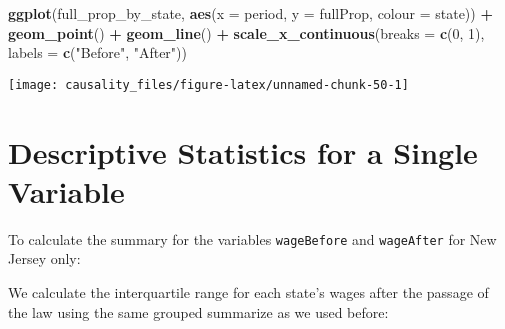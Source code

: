 \documentclass[]{book}
\newenvironment{Shaded}{\begin{snugshade}}{\end{snugshade}}
\newcommand{\KeywordTok}[1]{\textcolor[rgb]{0.13,0.29,0.53}{\textbf{#1}}}
\newcommand{\DataTypeTok}[1]{\textcolor[rgb]{0.13,0.29,0.53}{#1}}
\newcommand{\DecValTok}[1]{\textcolor[rgb]{0.00,0.00,0.81}{#1}}
\newcommand{\StringTok}[1]{\textcolor[rgb]{0.31,0.60,0.02}{#1}}
\newcommand{\CommentTok}[1]{\textcolor[rgb]{0.56,0.35,0.01}{\textit{#1}}}
\newcommand{\OperatorTok}[1]{\textcolor[rgb]{0.81,0.36,0.00}{\textbf{#1}}}
\newcommand{\NormalTok}[1]{#1}
\theoremstyle{definition}
\theoremstyle{definition}
\theoremstyle{definition}
\theoremstyle{remark}
\begin{document}
\begin{Shaded}
\begin{Highlighting}[]
\KeywordTok{ggplot}\NormalTok{(full_prop_by_state, }\KeywordTok{aes}\NormalTok{(}\DataTypeTok{x =}\NormalTok{ period, }\DataTypeTok{y =}\NormalTok{ fullProp, }\DataTypeTok{colour =}\NormalTok{ state)) }\OperatorTok{+}
\StringTok{  }\KeywordTok{geom_point}\NormalTok{() }\OperatorTok{+}
\StringTok{  }\KeywordTok{geom_line}\NormalTok{() }\OperatorTok{+}
\StringTok{  }\KeywordTok{scale_x_continuous}\NormalTok{(}\DataTypeTok{breaks =} \KeywordTok{c}\NormalTok{(}\DecValTok{0}\NormalTok{, }\DecValTok{1}\NormalTok{), }\DataTypeTok{labels =} \KeywordTok{c}\NormalTok{(}\StringTok{"Before"}\NormalTok{, }\StringTok{"After"}\NormalTok{))}
\end{Highlighting}
\end{Shaded}

\begin{center}\texttt{[image: causality\_files/figure-latex/unnamed-chunk-50-1]} \end{center}

\section{Descriptive Statistics for a Single
Variable}\label{descriptive-statistics-for-a-single-variable}

To calculate the summary for the variables \texttt{wageBefore} and
\texttt{wageAfter} for New Jersey only:

\begin{Shaded}
\end{Shaded}

We calculate the interquartile range for each state's wages after the
passage of the law using the same grouped summarize as we used before:
\end{document}
